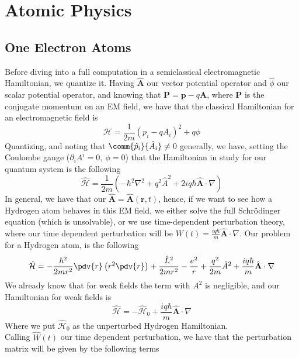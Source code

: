 \documentclass[a4paper, 11pt]{book}
\renewcommand{\vec}[1]{\mathbf{#1}}
\newcommand{\1}{\opr{\mathds{1}}}
\newcommand{\ham}{\mathcal{H}}
\newcommand{\opr}[1]{\hat{#1}}
\newcommand{\vecopr}[1]{\opr{\vec{#1}}}
\theoremstyle{plain}
\begin{document}
	\part{Atomic Physics}
	\chapter{One Electron Atoms}
	Before diving into a full computation in a semiclassical electromagnetic Hamiltonian, we quantize it. Having $\vecopr{A}$ our vector potential operator and $\opr{\phi}$ our scalar potential operator, and knowing that $\vec{P}=\vec{p}-q\vec{A}$, where $\vec{P}$ is the conjugate momentum on an EM field, we have that the classical Hamiltonian for an electromagnetic field is
	\begin{equation}
		\ham=\frac{1}{2m}\left( p_i-qA_i \right)^2+q\phi
		\label{eq:classemham}
	\end{equation}
	Quantizing, and noting that $\comm{\opr{p}_i}{\opr{A}_i}\ne0$ generally, we have, setting the Coulombe gauge ($\partial_iA^i=0,\ \phi=0$) that the Hamiltonian in study for our quantum system is the following
	\begin{equation}
		\opr{\ham}=\frac{1}{2m}\left( -\hbar^2\nabla^2+q^2\opr{A}^2+2iq\hbar\vecopr{A}\cdot\nabla\right)
		\label{eq:qhamemfield}
	\end{equation}
	In general, we have that our $\vecopr{A}=\vecopr{A}(\vec{r},t)$, hence, if we want to see how a Hydrogen atom behaves in this EM field, we either solve the full Schrödinger equation (which is unsolvable), or we use time-dependent perturbation theory, where our time dependent perturbation will be $W(t)=\frac{iq\hbar}{m}\vecopr{A}\cdot\nabla$. Our problem for a Hydrogen atom, is the following
	\begin{equation}
		\opr{\ham}=-\frac{\hbar^2}{2mr^2}\pdv{r}\left( r^2\pdv{r} \right)+\frac{\opr{L}^2}{2mr^2}-\frac{e^2}{r}+\frac{q^2}{2m}\opr{A}^2+\frac{iq\hbar}{m}\vecopr{A}\cdot\nabla
		\label{eq:fullpert}
	\end{equation}
	We already know that for weak fields the term with $A^2$ is negligible, and our Hamiltonian for weak fields is
	\begin{equation}
		\opr{\ham}=-\opr{\ham}_0+\frac{iq\hbar}{m}\vecopr{A}\cdot\nabla
		\label{eq:weakfieldemham}
	\end{equation}
	Where we put $\opr{\ham}_0$ as the unperturbed Hydrogen Hamiltonian.\\
	Calling $\opr{W}(t)$ our time dependent perturbation, we have that the perturbation matrix will be given by the following terms
\end{document}
